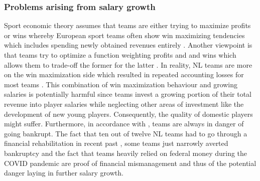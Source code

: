 \documentclass[12pt, a4paper]{article}
\begin{document}
\subsubsection{Problems arising from salary growth}
\label{salaryGrowthProblems}

Sport economic theory assumes that teams are either trying to maximize profits or wins whereby European sport teams often show win maximizing tendencies which includes spending newly obtained revenues entirely \citep{garcia-del-barrio_goal_2009}. Another viewpoint is that teams try to optimize a function weighting profits and and wins which allows them to trade-off the former for the latter \citep{dietl_competitive_2011}. In reality, NL teams are more on the win maximization side which resulted in repeated accounting losses for most teams \citep{hauptli_wie_2012}. This combination of win maximization behaviour and growing salaries is potentially harmful since teams invest a growing portion of their total revenue into player salaries while neglecting other areas of investment like the development of new young players. Consequently, the quality of domestic players might suffer. Furthermore, in accordance with \citet{whitney_bidding_1993}, teams are always in danger of going bankrupt. The fact that ten out of twelve NL teams had to go through a financial rehabilitation in recent past \citep[see][]{germann_kommentar_2021}, some teams just narrowly averted bankruptcy \citep[e.g.][]{ meile_unternehmer_2016} and the fact that teams heavily relied on federal money during the COVID pandemic \citep[see][]{noauthor_so_2021} are proof of financial mismanagement and thus of the potential danger laying in further salary growth. 
\end{document}
